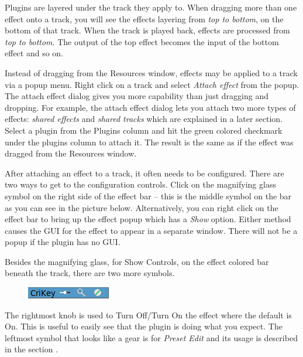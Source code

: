 Plugins are layered under the track they apply to. When dragging more than one effect onto a track, you will see the effects layering from \textit{top to bottom}, on the bottom of that track. When the track is played back, effects are processed from \textit{top to bottom}. The output of the top effect becomes the input of the bottom effect and so on.

Instead of dragging from the Resources window, effects may be applied to a track via a popup menu. Right click on a track and select \textit{Attach effect} from the popup. The attach effect dialog gives you more capability than just dragging and dropping. For example, the attach effect dialog lets you attach two more types of effects: \textit{shared effects} and \textit{shared tracks} which are explained in a later section. Select a plugin from the Plugins column and hit the green colored checkmark under the plugins column to attach it. The result is the same as if the effect was dragged from the Resources window.

After attaching an effect to a track, it often needs to be configured. There are two ways to get to the configuration controls. Click on the magnifying glass symbol on the right side of the effect bar -- this is the middle symbol on the bar as you can see in the picture below. Alternatively, you can right click on the effect bar to bring up the effect popup which has a \textit{Show} option. Either method causes the GUI for the effect to appear in a separate window. There will not be a popup if the plugin has no GUI.


Besides the magnifying glass, for Show Controls, on the effect colored bar beneath the track, there are two more symbols.

\begin{figure}
    \vspace{-3ex}
    \centering
    \includegraphics[width=0.7\linewidth]{images/button-options.png} 
\end{figure}

The rightmost knob is used to Turn Off/Turn On the effect where the default is On. This is useful to easily see that the plugin is doing what you expect. The leftmost symbol that looks like a gear is for \textit{Preset Edit} and its usage is described in the section .

